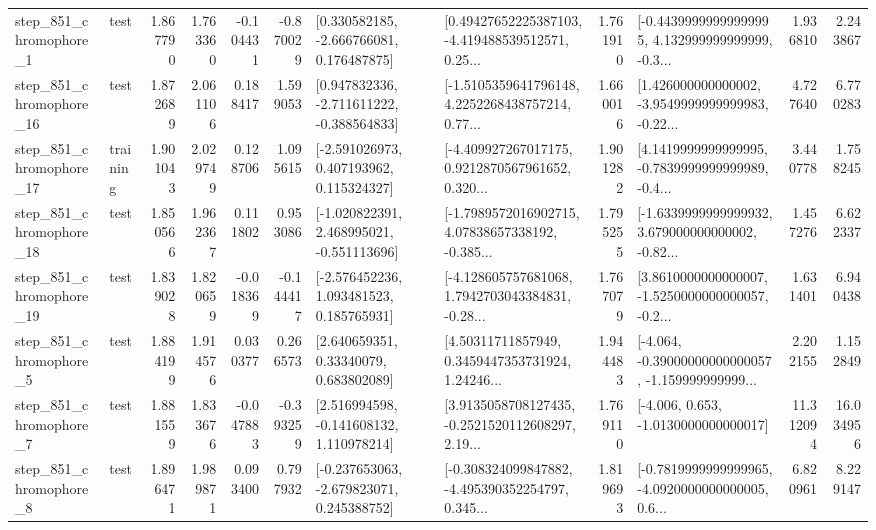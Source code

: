 \begin{tabular}{llrrrrllrlrr}
   step\_851\_chromophore\_1 &      test &      1.867790 &    1.763360 &     -0.104431 & -0.870029 &    [0.330582185, -2.666766081, 0.176487875] &  [0.49427652225387103, -4.419488539512571, 0.25... &       1.761910 &  [-0.44399999999999995, 4.132999999999999, -0.3... &            1.936810 &          2.243867 \\
  step\_851\_chromophore\_16 &      test &      1.872689 &    2.061106 &      0.188417 &  1.599053 &   [0.947832336, -2.711611222, -0.388564833] &  [-1.5105359641796148, 4.2252268438757214, 0.77... &       1.660016 &  [1.426000000000002, -3.9549999999999983, -0.22... &            4.727640 &          6.770283 \\
  step\_851\_chromophore\_17 &  training &      1.901043 &    2.029749 &      0.128706 &  1.095615 &    [-2.591026973, 0.407193962, 0.115324327] &  [-4.409927267017175, 0.9212870567961652, 0.320... &       1.901282 &  [4.1419999999999995, -0.7839999999999989, -0.4... &            3.440778 &          1.758245 \\
  step\_851\_chromophore\_18 &      test &      1.850566 &    1.962367 &      0.111802 &  0.953086 &   [-1.020822391, 2.468995021, -0.551113696] &  [-1.7989572016902715, 4.07838657338192, -0.385... &       1.795255 &  [-1.6339999999999932, 3.679000000000002, -0.82... &            1.457276 &          6.622337 \\
  step\_851\_chromophore\_19 &      test &      1.839028 &    1.820659 &     -0.018369 & -0.144417 &    [-2.576452236, 1.093481523, 0.185765931] &  [-4.128605757681068, 1.7942703043384831, -0.28... &       1.767079 &  [3.8610000000000007, -1.5250000000000057, -0.2... &            1.631401 &          6.940438 \\
   step\_851\_chromophore\_5 &      test &      1.884199 &    1.914576 &      0.030377 &  0.266573 &      [2.640659351, 0.33340079, 0.683802089] &  [4.50311711857949, 0.3459447353731924, 1.24246... &       1.944483 &  [-4.064, -0.39000000000000057, -1.159999999999... &            2.202155 &          1.152849 \\
   step\_851\_chromophore\_7 &      test &      1.881559 &    1.833676 &     -0.047883 & -0.393259 &    [2.516994598, -0.141608132, 1.110978214] &  [3.9135058708127435, -0.2521520112608297, 2.19... &       1.769110 &               [-4.006, 0.653, -1.0130000000000017] &           11.312094 &         16.034956 \\
   step\_851\_chromophore\_8 &      test &      1.896471 &    1.989871 &      0.093400 &  0.797932 &   [-0.237653063, -2.679823071, 0.245388752] &  [-0.308324099847882, -4.495390352254797, 0.345... &       1.819693 &  [-0.7819999999999965, -4.0920000000000005, 0.6... &            6.820961 &          8.229147 \\

\end{tabular}
